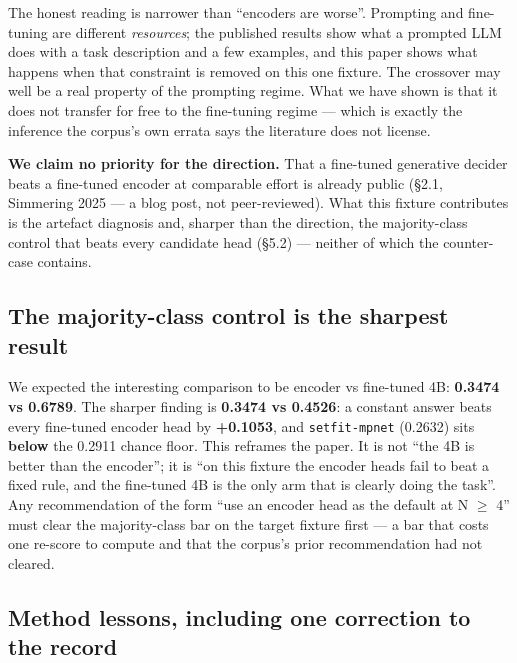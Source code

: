 \documentclass[10pt]{article}
\begin{document}
The honest reading is narrower than ``encoders are worse''. Prompting and fine-tuning are different \emph{resources}; the published results show what a prompted LLM does with a task description and a few examples, and this paper shows what happens when that constraint is removed on this one fixture. The crossover may well be a real property of the prompting regime. What we have shown is that it does not transfer for free to the fine-tuning regime --- which is exactly the inference the corpus's own errata says the literature does not license.

\textbf{We claim no priority for the direction.} That a fine-tuned generative decider beats a fine-tuned encoder at comparable effort is already public (\S2.1, Simmering 2025 --- a blog post, not peer-reviewed). What this fixture contributes is the artefact diagnosis and, sharper than the direction, the majority-class control that beats every candidate head (\S5.2) --- neither of which the counter-case contains.

\subsection{The majority-class control is the sharpest result}

We expected the interesting comparison to be encoder vs fine-tuned 4B: \textbf{0.3474 vs 0.6789}. The sharper finding is \textbf{0.3474 vs 0.4526}: a constant answer beats every fine-tuned encoder head by \textbf{+0.1053}, and \texttt{setfit-mpnet} (0.2632) sits \textbf{below} the 0.2911 chance floor. This reframes the paper. It is not ``the 4B is better than the encoder''; it is ``on this fixture the encoder heads fail to beat a fixed rule, and the fine-tuned 4B is the only arm that is clearly doing the task''. Any recommendation of the form ``use an encoder head as the default at N $\ge$ 4'' must clear the majority-class bar on the target fixture first --- a bar that costs one re-score to compute and that the corpus's prior recommendation had not cleared.

\subsection{Method lessons, including one correction to the record}
\end{document}
